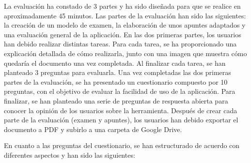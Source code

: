 La evaluación ha constado de 3 partes y ha sido diseñada para que se realice en aproximadamente 45 minutos. Las partes de la evaluación han sido las siguientes: la creación de un modelo de examen, la elaboración de unos apuntes adaptados y una evaluación general de la aplicación. En las dos primeras partes, los usuarios han debido realizar distintas tareas. Para cada tarea, se ha proporcionado una explicación detallada de cómo realizarla, junto con una imagen que muestra cómo quedaría el documento una vez completada. Al finalizar cada tarea, se han planteado 3 preguntas para evaluarla. Una vez completadas las dos primeras partes de la evaluación, se ha presentado un cuestionario compuesto por 10 preguntas, con el objetivo de evaluar la facilidad de uso de la aplicación. Para finalizar, se han planteado una serie de preguntas de respuesta abierta para conocer la opinión de los usuarios sobre la herramienta. Después de crear cada parte de la evaluación (examen y apuntes), los usuarios han debido exportar el documento a PDF y subirlo a una carpeta de Google Drive.

En cuanto a las preguntas del cuestionario, se han estructurado de acuerdo con diferentes aspectos y han sido las siguientes:

